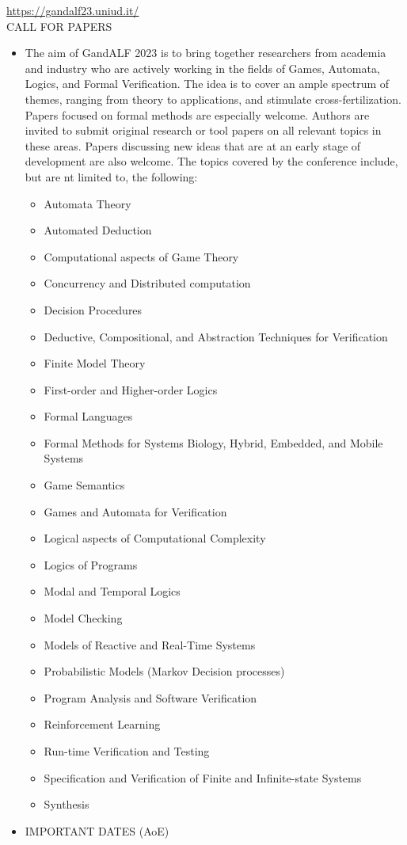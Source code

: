 \documentclass[prodmode,acmtecs]{acmsmall} %
\begin{document}
  \href{https://gandalf23.uniud.it/}{https://gandalf23.uniud.it/}\\ 
CALL FOR PAPERS 

\begin{itemize}\item  The aim of GandALF 2023 is to bring together researchers from academia and industry who are actively working in the fields of Games, Automata, Logics, and Formal Verification. The idea is to cover an ample spectrum of themes, ranging from theory to applications, and stimulate cross-fertilization. Papers focused on formal methods are especially welcome. Authors are invited to submit original research or tool papers on all relevant topics in these areas. Papers discussing new ideas that are at an early stage of development are also welcome. The topics covered by the conference include, but are nt limited to, the following: 
 
\begin{itemize}\item  Automata Theory
\item  Automated Deduction
\item  Computational aspects of Game Theory
\item  Concurrency and Distributed computation
\item  Decision Procedures
\item  Deductive, Compositional, and Abstraction Techniques for Verification
\item  Finite Model Theory
\item  First-order and Higher-order Logics
\item  Formal Languages
\item Formal Methods for Systems Biology, Hybrid, Embedded, and Mobile Systems
\item Game Semantics
\item Games and Automata for Verification
\item Logical aspects of Computational Complexity
\item Logics of Programs
\item Modal and Temporal Logics
\item Model Checking
\item Models of Reactive and Real-Time Systems
\item Probabilistic Models (Markov Decision processes)
\item Program Analysis and Software Verification
\item Reinforcement Learning
\item Run-time Verification and Testing
\item Specification and Verification of Finite and Infinite-state Systems
\item Synthesis
\end{itemize} 
\item  IMPORTANT DATES (AoE) 
 

\end{itemize}
\end{document}
